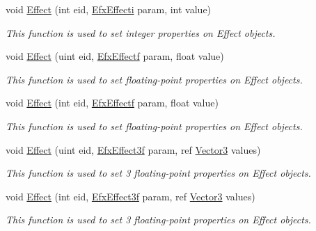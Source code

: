 \begin{DoxyCompactItemize}
void \hyperlink{class_open_t_k_1_1_audio_1_1_open_a_l_1_1_effects_extension_abdafac8cff4580029c966016d961fc78}{Effect} (int eid, \hyperlink{namespace_open_t_k_1_1_audio_1_1_open_a_l_a49039c1ddcb53675576ad2780fc50315}{Efx\-Effecti} param, int value)
\begin{DoxyCompactList}\small\item\em This function is used to set integer properties on Effect objects.\end{DoxyCompactList}\item 
void \hyperlink{class_open_t_k_1_1_audio_1_1_open_a_l_1_1_effects_extension_a977a21cccce0607687124183aae8df37}{Effect} (uint eid, \hyperlink{namespace_open_t_k_1_1_audio_1_1_open_a_l_aa0356299908369b4365d28572c0ec20b}{Efx\-Effectf} param, float value)
\begin{DoxyCompactList}\small\item\em This function is used to set floating-\/point properties on Effect objects.\end{DoxyCompactList}\item 
void \hyperlink{class_open_t_k_1_1_audio_1_1_open_a_l_1_1_effects_extension_a87d6e1b2768acd65344d00b77c388b0c}{Effect} (int eid, \hyperlink{namespace_open_t_k_1_1_audio_1_1_open_a_l_aa0356299908369b4365d28572c0ec20b}{Efx\-Effectf} param, float value)
\begin{DoxyCompactList}\small\item\em This function is used to set floating-\/point properties on Effect objects.\end{DoxyCompactList}\item 
void \hyperlink{class_open_t_k_1_1_audio_1_1_open_a_l_1_1_effects_extension_ac876b068080042c1211133eddf148705}{Effect} (uint eid, \hyperlink{namespace_open_t_k_1_1_audio_1_1_open_a_l_a1c69083823578d237ab570da681a5cfa}{Efx\-Effect3f} param, ref \hyperlink{struct_open_t_k_1_1_vector3}{Vector3} values)
\begin{DoxyCompactList}\small\item\em This function is used to set 3 floating-\/point properties on Effect objects.\end{DoxyCompactList}\item 
void \hyperlink{class_open_t_k_1_1_audio_1_1_open_a_l_1_1_effects_extension_a8f3d27c67dbb8a6963c28024b05707ea}{Effect} (int eid, \hyperlink{namespace_open_t_k_1_1_audio_1_1_open_a_l_a1c69083823578d237ab570da681a5cfa}{Efx\-Effect3f} param, ref \hyperlink{struct_open_t_k_1_1_vector3}{Vector3} values)
\begin{DoxyCompactList}\small\item\em This function is used to set 3 floating-\/point properties on Effect objects.\end{DoxyCompactList}\item 

\end{DoxyCompactItemize}
